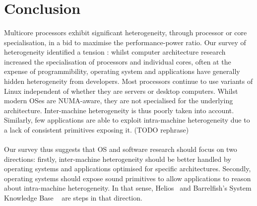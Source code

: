 \section{Conclusion}

\paragraph{}Multicore processors exhibit significant heterogeneity, through processor or core specialisation, in a bid
to maximise the performance-power ratio. Our 
survey of heterogeneity identified a tension :
whilst computer architecture research increased
the specialisation of processors and individual cores,
often at the expense of programmibility, 
operating system and applications have generally 
hidden heterogeneity from developers. Most processors 
continue to use variants of Linux independent of
whether they are servers or desktop computers. 
Whilst modern OSes are NUMA-aware, they are not specialised for the underlying architecture. Inter-machine heterogeneity is thus poorly taken into account. Similarly, 
few applications are able to exploit intra-machine
heterogeneity due to a lack of consistent primitives exposing it. (TODO rephrase)


\paragraph{} Our survey thus suggests that OS and software research should focus on two directions:
firstly, inter-machine heterogeneity should be better handled by operating systems
and applications optimised for specific architectures. Secondly, operating 
systems should expose sound primitives to allow applications to reason about 
intra-machine heterogeneity. In that sense, Helios~\cite{nightingale2009helios}
 and Barrelfish's System Knowledge Base ~\cite{schupbach08embracingdiversity} are 
steps in that direction. 


